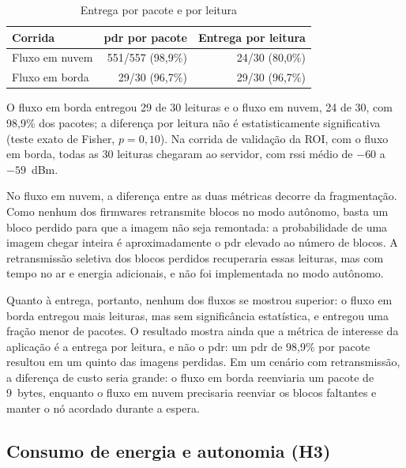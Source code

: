 \begin{table}[H]
    \centering
    \caption{Entrega por pacote e por leitura}
    \label{tab:resultado_entrega}
    \begin{tabularx}{\textwidth}{@{}Xrr@{}}
        \toprule
        \textbf{Corrida} & \textbf{\gls{pdr} por pacote} & \textbf{Entrega por leitura} \\
        \midrule
        Fluxo em nuvem & 551/557 (98,9\%) & 24/30 (80,0\%) \\
        Fluxo em borda & 29/30 (96,7\%) & 29/30 (96,7\%) \\
        \bottomrule
    \end{tabularx}
\end{table}

O fluxo em borda entregou 29 de 30 leituras e o fluxo em nuvem, 24 de 30, com 98,9\% dos
pacotes; a diferença por leitura não é estatisticamente significativa (teste exato de
Fisher, $p = 0{,}10$). Na corrida de validação da ROI, com o fluxo em borda, todas
as 30 leituras chegaram ao servidor, com \gls{rssi} médio de $-60$ a $-59$~dBm.

No fluxo em nuvem, a diferença entre as duas métricas decorre da fragmentação. Como nenhum
dos firmwares retransmite blocos no modo autônomo, basta um bloco perdido para que a imagem
não seja remontada: a probabilidade de uma imagem chegar inteira é aproximadamente o
\gls{pdr} elevado ao número de blocos. A retransmissão seletiva dos blocos perdidos
recuperaria essas leituras, mas com tempo no ar e energia adicionais, e não foi implementada
no modo autônomo.

Quanto à entrega, portanto, nenhum dos fluxos se mostrou superior: o fluxo em borda entregou
mais leituras, mas sem significância estatística, e entregou uma fração menor de pacotes.
O resultado mostra ainda que a métrica de interesse da aplicação é a entrega por leitura, e
não o \gls{pdr}: um \gls{pdr} de 98,9\% por pacote resultou em um quinto das imagens
perdidas. Em um cenário com retransmissão, a diferença de custo seria grande: o fluxo em
borda reenviaria um pacote de 9~bytes, enquanto o fluxo em nuvem precisaria reenviar os
blocos faltantes e manter o nó acordado durante a espera.

\subsection{Consumo de energia e autonomia (H3)}
\label{subsec:resultado_energia}

